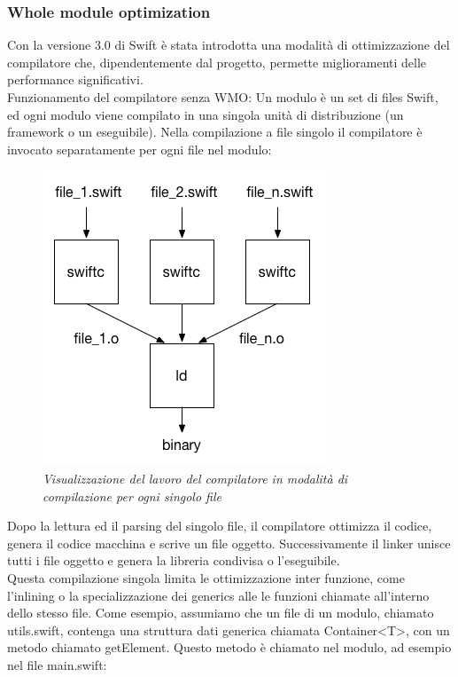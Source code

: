 \subsubsection{Whole module optimization}
Con la versione 3.0 di Swift è stata introdotta una modalità di ottimizzazione del compilatore che, dipendentemente dal progetto, permette miglioramenti delle performance significativi.\\
Funzionamento del compilatore senza WMO:
Un modulo è un set di files Swift, ed ogni modulo viene compilato in una singola unità di distribuzione (un framework o un eseguibile). Nella compilazione a file singolo il compilatore è invocato separatamente per ogni file nel modulo: 
\begin{figure}
      \centering
      \includegraphics[scale=0.80]{immagini/single-file.png}
            \vspace{0.8cm}
            \caption{\textit{Visualizzazione del lavoro del compilatore in modalità di compilazione per ogni singolo file}}
    \end{figure}
Dopo la lettura ed il parsing del singolo file, il compilatore ottimizza il codice, genera il codice macchina e scrive un file oggetto. Successivamente il linker unisce tutti i file oggetto e genera la libreria condivisa o l'eseguibile.\\
Questa compilazione singola limita le ottimizzazione inter funzione, come l'inlining o la specializzazione dei generics alle le funzioni chiamate all'interno dello stesso file. Come esempio, assumiamo che un file di un modulo, chiamato utils.swift, contenga una struttura dati generica chiamata Container<T>, con un metodo chiamato getElement. Questo metodo è chiamato nel modulo, ad esempio nel file main.swift:
